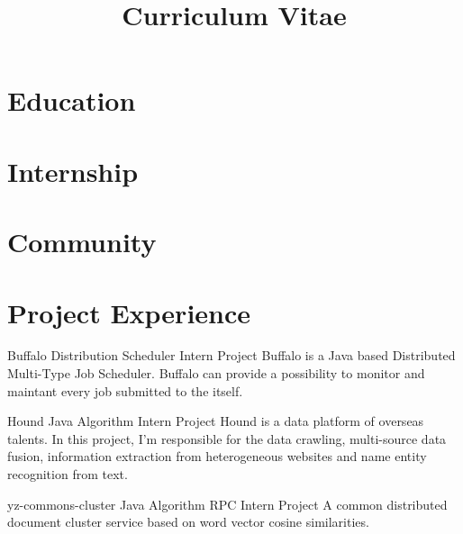 \documentclass[11pt,a4paper]{moderncv}
\title{Curriculum Vitae}
\begin{document}
\maketitle

\section{Education}

\section{Internship}

\section{Community}

\section{Project Experience}

{Buffalo}
{Distribution Scheduler}
{Intern Project}{}
{
Buffalo is a Java based Distributed Multi-Type Job Scheduler. Buffalo can provide a possibility to monitor and maintant every job submitted to the itself.
}

{Hound}
{Java Algorithm}
{Intern Project}{}
{
Hound is a data platform of overseas talents. In this project, I'm responsible for the data crawling, multi-source data fusion, information extraction from heterogeneous websites and name entity recognition from text.
}


\vspace*{0.2\baselineskip}
{yz-commons-cluster}
{Java Algorithm RPC}
{Intern Project}{}
{A common distributed document cluster service based on word vector cosine similarities.}
\end{document}
